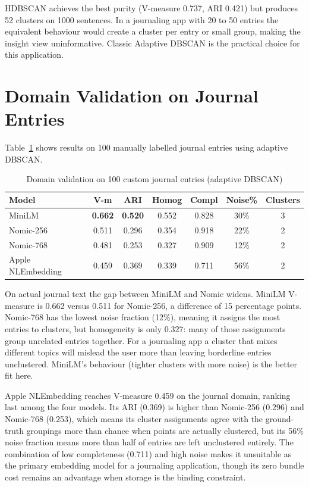 HDBSCAN achieves the best purity (V-measure 0.737, ARI 0.421) but produces 52 clusters on 1000 sentences. In a journaling app with 20 to 50 entries the equivalent behaviour would create a cluster per entry or small group, making the insight view uninformative. Classic Adaptive DBSCAN is the practical choice for this application.

\section{Domain Validation on Journal Entries}
\label{sec:domain_validation}

Table~\ref{tab:domain_validation} shows results on 100 manually labelled journal entries using adaptive DBSCAN.

\begin{table}[h]
\centering
\caption{Domain validation on 100 custom journal entries (adaptive DBSCAN)}
\label{tab:domain_validation}
\begin{tabular}{|l|c|c|c|c|c|c|}
\hline
\textbf{Model} & \textbf{V-m} & \textbf{ARI} & \textbf{Homog} & \textbf{Compl} & \textbf{Noise\%} & \textbf{Clusters} \\
\hline
MiniLM            & \textbf{0.662} & \textbf{0.520} & 0.552 & 0.828 & 30\% & 3 \\
Nomic-256         & 0.511          & 0.296          & 0.354 & 0.918 & 22\% & 2 \\
Nomic-768         & 0.481          & 0.253          & 0.327 & 0.909 & 12\% & 2 \\
Apple NLEmbedding & 0.459          & 0.369          & 0.339 & 0.711 & 56\% & 2 \\
\hline
\end{tabular}
\end{table}

On actual journal text the gap between MiniLM and Nomic widens. MiniLM V-measure is 0.662 versus 0.511 for Nomic-256, a difference of 15 percentage points. Nomic-768 has the lowest noise fraction (12\%), meaning it assigns the most entries to clusters, but homogeneity is only 0.327: many of those assignments group unrelated entries together. For a journaling app a cluster that mixes different topics will mislead the user more than leaving borderline entries unclustered. MiniLM's behaviour (tighter clusters with more noise) is the better fit here.

Apple NLEmbedding reaches V-measure 0.459 on the journal domain, ranking last among the four models. Its ARI (0.369) is higher than Nomic-256 (0.296) and Nomic-768 (0.253), which means its cluster assignments agree with the ground-truth groupings more than chance when points are actually clustered, but its 56\% noise fraction means more than half of entries are left unclustered entirely. The combination of low completeness (0.711) and high noise makes it unsuitable as the primary embedding model for a journaling application, though its zero bundle cost remains an advantage when storage is the binding constraint.

